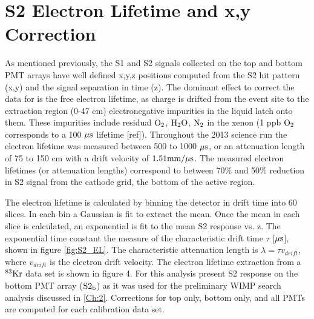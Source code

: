 
\section{S2 Electron Lifetime and x,y Correction}

As mentioned previously, the S1 and S2 signals collected on the top and bottom PMT arrays have well defined x,y,z positions computed from the S2 hit pattern (x,y) and the signal separation in time (z). The dominant effect to correct the data for is the free electron lifetime, as charge is drifted from the event site to the extraction region (0-47 cm) electronegative impurities in the liquid latch onto them. These impurities include residual $\rm O_2$, $\rm H_2O$, $\rm N_2$ in the xenon (1 ppb $\rm O_2$ corresponds to a 100 $\rm \mu s$ lifetime [ref]). Throughout the 2013 science run the electron lifetime was measured between 500 to 1000 $\rm \mu s$, or an attenuation length of 75 to 150 cm with a drift velocity of $\rm 1.51 mm/\mu s$. The measured electron lifetimes (or attenuation lengths) correspond to between 70\% and 50\% reduction in S2 signal from the cathode grid, the bottom of the active region.
 
The electron lifetime is calculated by binning the detector in drift time into 60 slices. In each bin a Gaussian is fit to extract the mean. Once the mean in each slice is calculated, an exponential is fit to the mean S2 response vs. z. The exponential time constant the measure of the characteristic drift time $\tau$ [$\rm \mu s$], shown in figure \ref{fig:S2_EL}. The characteristic attenuation length is $\lambda = \tau v_{drift}$, where $v_{drift}$ is the electron drift velocity. The electron lifetime extraction from a $\rm^{83}Kr$ data set is shown in figure 4.  For this analysis present S2 response on the bottom PMT array ($\rm S2_b$) as it was used for the preliminary WIMP search analysis discussed in \ref{Ch:2}. Corrections for top only, bottom only, and all PMTs are computed for each \KrCal calibration data set.

